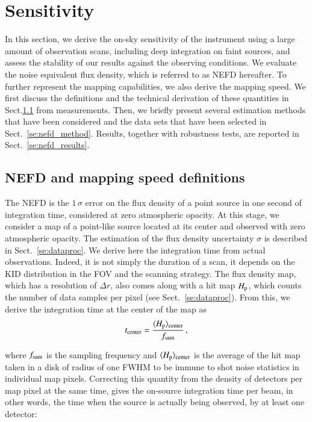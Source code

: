 \documentclass[traditionalabstract]{aa}
\begin{document}
\section{Sensitivity}
\label{se:sensitivity}
%

In this section, we derive the on-sky sensitivity of the instrument using a
large amount of observation scans, including deep integration on faint sources,
and assess the stability of our results against the observing
conditions.
We evaluate the noise equivalent flux density, which is referred to as
NEFD hereafter. To further represent the mapping capabilities, we also
derive the mapping speed.
We first discuss the definitions and the technical derivation of these quantities in
Sect.\ref{se:integration_time} from measurements. Then, we briefly present
several estimation methods that have been considered and the data sets that have
been selected in Sect.~\ref{se:nefd_method}. Results, together with robustness
tests, are reported in Sect.~\ref{se:nefd_results}.


\subsection{NEFD and mapping speed definitions}
\label{se:integration_time}

The NEFD is the $1\,\sigma$ error on the flux
density of a point source in one second of integration time,
considered at zero atmospheric opacity.
At this stage, we consider a map of a point-like source located at its
center and observed with zero atmospheric opacity. The estimation of
the flux density uncertainty $\sigma$ is described in Sect.~\ref{se:dataproc}.
We derive here the integration time from actual observations. Indeed,
it is not simply the duration of a scan, it depends on the KID
distribution in the FOV and the scanning strategy.
The flux density map, which has a resolution of $\Delta r$, also comes
along with a hit map $H_{\rm{p}}$, which counts the number of
data samples per pixel (see Sect.~\ref{se:dataproc}).
From this, we derive the integration time at the center
of the map as
\begin{equation}
t_{\rm{center}} = \frac{\langle H_{\rm{p}}\rangle_{\rm{center}}}{f_{\rm{sam}}}\,,
\end{equation}

where $f_{\rm{sam}}$ is the sampling frequency and $\langle
H_{\rm{p}}\rangle_{\rm{center}}$ is the average of the hit map taken in a disk
of radius of one FWHM to be immune to shot noise statistics in individual map
pixels. Correcting this quantity from the density of detectors per map pixel at
the same time, gives the on-source integration time per beam, in other
words, the time when the source is actually being observed, by at least one
detector:
\end{document}

